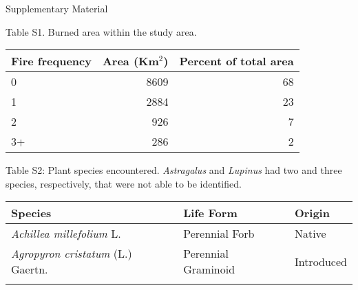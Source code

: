 \documentclass[8pt,]{article}
\title{}
\author{}
\date{}
\begin{document}
Supplementary Material

Table S1. Burned area within the study area.

\begin{longtable}[]{@{}lrr@{}}
\toprule
Fire frequency & Area (Km\(^2\)) & Percent of total area\tabularnewline
\midrule
\endhead
0 & 8609 & 68\tabularnewline
1 & 2884 & 23\tabularnewline
2 & 926 & 7\tabularnewline
3+ & 286 & 2\tabularnewline
\bottomrule
\end{longtable}

\clearpage
\newpage

Table S2: Plant species encountered. \emph{Astragalus} and
\emph{Lupinus} had two and three species, respectively, that were not
able to be identified.

\begin{longtable}[]{@{}lll@{}}
\toprule
\begin{minipage}[b]{0.49\columnwidth}\raggedright\strut
Species\strut
\end{minipage} & \begin{minipage}[b]{0.27\columnwidth}\raggedright\strut
Life Form\strut
\end{minipage} & \begin{minipage}[b]{0.15\columnwidth}\raggedright\strut
Origin\strut
\end{minipage}\tabularnewline
\midrule
\endhead
\begin{minipage}[t]{0.49\columnwidth}\raggedright\strut
\emph{Achillea millefolium} L.\strut
\end{minipage} & \begin{minipage}[t]{0.27\columnwidth}\raggedright\strut
Perennial Forb\strut
\end{minipage} & \begin{minipage}[t]{0.15\columnwidth}\raggedright\strut
Native\strut
\end{minipage}\tabularnewline
\begin{minipage}[t]{0.49\columnwidth}\raggedright\strut
\emph{Agropyron cristatum} (L.) Gaertn.\strut
\end{minipage} & \begin{minipage}[t]{0.27\columnwidth}\raggedright\strut
Perennial Graminoid\strut
\end{minipage} & \begin{minipage}[t]{0.15\columnwidth}\raggedright\strut
Introduced\strut
\end{minipage}\tabularnewline
\begin{minipage}[t]{0.49\columnwidth}\raggedright\strut

\end{minipage}
\end{longtable}
\end{document}
